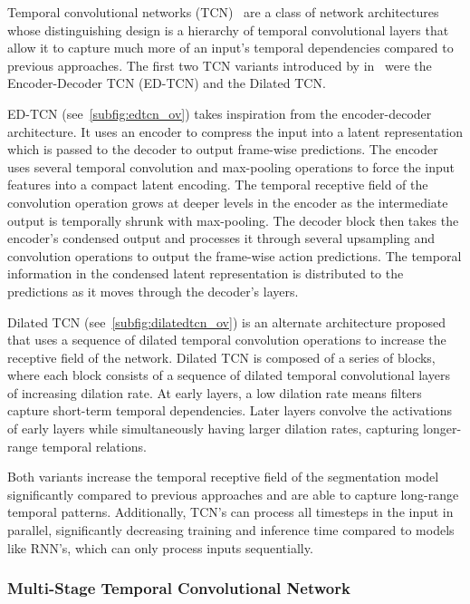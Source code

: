 

Temporal convolutional networks (TCN)~\cite{lea2017tcn} are a class of network architectures whose distinguishing design is a hierarchy of temporal convolutional layers that allow it to capture much more of an input's temporal dependencies compared to previous approaches. The first two TCN variants introduced by \citeauthor{lea2017tcn} in~\cite{lea2017tcn} were the Encoder-Decoder TCN (ED-TCN) and the Dilated TCN.

ED-TCN (see~\cref{subfig:edtcn_ov}) takes inspiration from the encoder-decoder architecture. It uses an encoder to compress the input into a latent representation which is passed to the decoder to output frame-wise predictions. The encoder uses several temporal convolution and max-pooling operations to force the input features into a compact latent encoding. The temporal receptive field of the convolution operation grows at deeper levels in the encoder as the intermediate output is temporally shrunk with max-pooling. The decoder block then takes the encoder's condensed output and processes it through several upsampling and convolution operations to output the frame-wise action predictions. The temporal information in the condensed latent representation is distributed to the predictions as it moves through the decoder's layers. 

Dilated TCN (see~\cref{subfig:dilatedtcn_ov}) is an alternate architecture proposed that uses a sequence of dilated temporal convolution operations to increase the receptive field of the network. Dilated TCN is composed of a series of blocks, where each block consists of a sequence of dilated temporal convolutional layers of increasing dilation rate. At early layers, a low dilation rate means filters capture short-term temporal dependencies. Later layers convolve the activations of early layers while simultaneously having larger dilation rates, capturing longer-range temporal relations.

Both variants increase the temporal receptive field of the segmentation model significantly compared to previous approaches and are able to capture long-range temporal patterns. Additionally, TCN's can process all timesteps in the input in parallel, significantly decreasing training and inference time compared to models like RNN's, which can only process inputs sequentially.

\subsubsection{Multi-Stage Temporal Convolutional Network}

